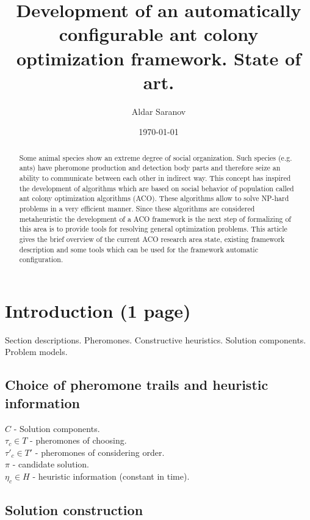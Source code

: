 \documentclass[12pt]{article}
\author{Aldar Saranov}
\date{\today}
\title{Development of an automatically configurable ant colony optimization framework. State of art.}
\begin{document}
\maketitle 
\newpage

\tableofcontents
\newpage

\begin{abstract}
Some animal species show an extreme degree of social organization. Such species (e.g. ants) have pheromone production and detection body parts and therefore seize an ability to communicate between each other in indirect way. This concept has inspired the development of algorithms which are based on social behavior of population called ant colony optimization algorithms (ACO). These algorithms allow to solve NP-hard problems in a very efficient manner. Since these algorithms are considered metaheuristic the development of a ACO framework is the next step of formalizing of this area is to provide tools for resolving general optimization problems. This article gives the brief overview of the current ACO research area state, existing framework description and some tools which can be used for the framework automatic configuration.
\end{abstract}



\section{Introduction (1 page)}
Section descriptions.
Pheromones.
Constructive heuristics.
Solution components.
Problem models.




\subsection{Choice of pheromone trails and heuristic information}

$C$ - Solution components. \\
$\tau_c \in T$ - pheromones of choosing. \\
$\tau'_c \in T'$ - pheromones of considering order. \\
$\pi$ - candidate solution. \\
$\eta_c \in H$ - heuristic information (constant in time). \\

\subsection{Solution construction}
\end{document}
